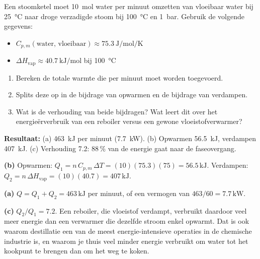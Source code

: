 \begin{oefening}\label{oef:h1-6}
Een stoomketel moet \SI{10}{\mole} water per minuut omzetten van vloeibaar water bij \SI{25}{\celsius} naar droge verzadigde stoom bij \SI{100}{\celsius} en \SI{1}{\bar}. Gebruik de volgende gegevens:
\begin{itemize}
\item $C_{p,m}(\text{water, vloeibaar}) \approx \SI{75.3}{\joule\per\mole\per\kelvin}$
\item $\Delta H_{\text{vap}} \approx \SI{40.7}{\kilo\joule\per\mole}$ bij \SI{100}{\celsius}
\end{itemize}
\begin{enumerate}
\item[(a)] Bereken de totale warmte die per minuut moet worden toegevoerd.
\item[(b)] Splits deze op in de bijdrage van opwarmen en de bijdrage van verdampen.
\item[(c)] Wat is de verhouding van beide bijdragen? Wat leert dit over het energie\"erverbruik van een reboiler versus een gewone vloeistofverwarmer?
\end{enumerate}    
\end{oefening}
\begin{oplossing}
\textbf{Resultaat:} (a) \SI{463}{\kilo\joule} per minuut (\SI{7.7}{\kilo\watt}). (b) Opwarmen \SI{56.5}{\kilo\joule}, verdampen \SI{407}{\kilo\joule}. (c) Verhouding 7.2: 88\,\% van de energie gaat naar de faseovergang.

\textbf{(b)} Opwarmen: $Q_1 = n\,C_{p,m}\,\Delta T = (10)(75.3)(75) = 56.5\,\mathrm{kJ}$. Verdampen: $Q_2 = n\,\Delta H_{\text{vap}} = (10)(40.7) = 407\,\mathrm{kJ}$.

\textbf{(a)} $Q = Q_1 + Q_2 = 463\,\mathrm{kJ}$ per minuut, of een vermogen van $463/60 = 7.7\,\mathrm{kW}$.

\textbf{(c)} $Q_2/Q_1 = 7.2$. Een reboiler, die vloeistof verdampt, verbruikt daardoor veel meer energie dan een verwarmer die dezelfde stroom enkel opwarmt. Dat is ook waarom destillatie een van de meest energie-intensieve operaties in de chemische industrie is, en waarom je thuis veel minder energie verbruikt om water tot het kookpunt te brengen dan om het weg te koken.
\end{oplossing}

